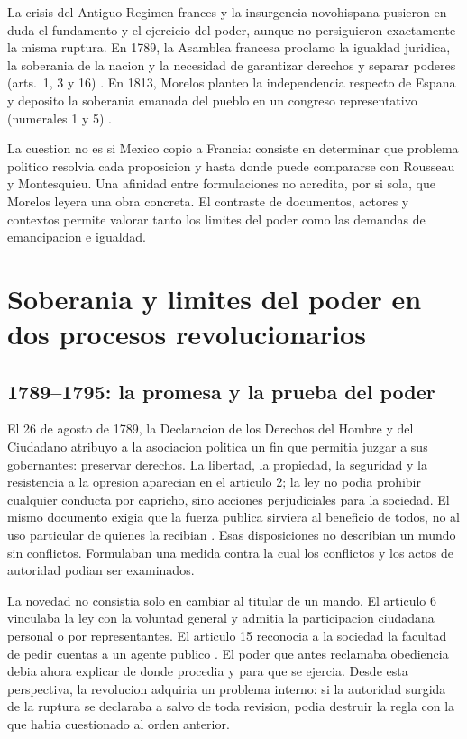 \documentclass[spanish,letterpaper,oneside]{article}
\begin{document}
La crisis del Antiguo Regimen frances y la insurgencia novohispana
pusieron en duda el fundamento y el ejercicio del poder, aunque no
persiguieron exactamente la misma ruptura. En 1789, la Asamblea francesa
proclamo la igualdad juridica, la soberania de la nacion y la necesidad
de garantizar derechos y separar poderes (arts.~1, 3 y 16)
\citep{francia1789}. En 1813, Morelos planteo la independencia respecto
de Espana y deposito la soberania emanada del pueblo en un congreso
representativo (numerales 1 y 5) \citep{morelos2020}.

La cuestion no es si Mexico copio a Francia: consiste en determinar que
problema politico resolvia cada proposicion y hasta donde puede
compararse con Rousseau y Montesquieu. Una afinidad entre formulaciones
no acredita, por si sola, que Morelos leyera una obra concreta. El
contraste de documentos, actores y contextos permite valorar tanto los
limites del poder como las demandas de emancipacion e igualdad.

\section{Soberania y limites del poder en dos procesos revolucionarios}
\subsection{1789--1795: la promesa y la prueba del poder}

El 26 de agosto de 1789, la Declaracion de los Derechos del Hombre y
del Ciudadano atribuyo a la asociacion politica un fin que permitia
juzgar a sus gobernantes: preservar derechos. La libertad, la propiedad,
la seguridad y la resistencia a la opresion aparecian en el articulo 2;
la ley no podia prohibir cualquier conducta por capricho, sino acciones
perjudiciales para la sociedad. El mismo documento exigia que la fuerza
publica sirviera al beneficio de todos, no al uso particular de quienes
la recibian \citep[arts.~2, 5 y 12]{francia1789}. Esas disposiciones
no describian un mundo sin conflictos. Formulaban una medida contra
la cual los conflictos y los actos de autoridad podian ser examinados.

La novedad no consistia solo en cambiar al titular de un mando. El
articulo 6 vinculaba la ley con la voluntad general y admitia la
participacion ciudadana personal o por representantes. El articulo 15
reconocia a la sociedad la facultad de pedir cuentas a un agente
publico \citep[arts.~6 y 15]{francia1789}. El poder que antes reclamaba
obediencia debia ahora explicar de donde procedia y para que se
ejercia. Desde esta perspectiva, la revolucion adquiria un problema
interno: si la autoridad surgida de la ruptura se declaraba a salvo de
toda revision, podia destruir la regla con la que habia cuestionado
al orden anterior.
\end{document}
